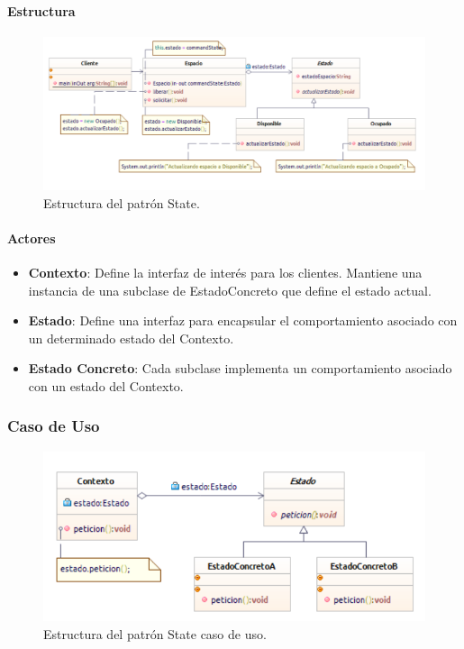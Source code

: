 \paragraph{Estructura}

\begin{figure}[th!]
	\centering
	\includegraphics[width=.7\linewidth]{imagenes/Patrones/State.pdf}
	\caption{Estructura del patrón State.\cite{gof}}	
\end{figure}

\paragraph{Actores}

\begin{itemize}
	\item \textbf{Contexto}: Define la interfaz de interés para los clientes. Mantiene una instancia de una subclase de EstadoConcreto que define el estado actual.
	\item \textbf{Estado}: Define una interfaz para encapsular el comportamiento asociado con un determinado estado del Contexto.
	\item \textbf{Estado Concreto}: Cada subclase implementa un comportamiento asociado con un estado del Contexto.
\end{itemize}


\subsubsection{Caso de Uso}

\begin{figure}[th!]
	\centering
	\includegraphics[width=.7\linewidth]{imagenes/Patrones/State_caso.pdf}
	\caption{Estructura del patrón State caso de uso.\cite{gof}}	
\end{figure}

